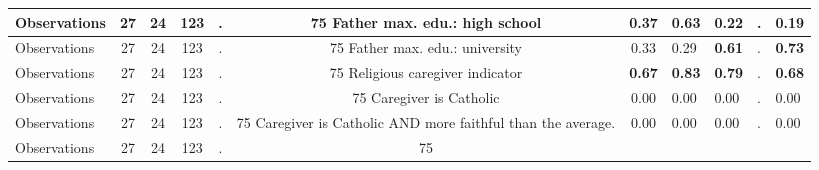 \begin{tabular}{l c c c c c c }
\midrule
Observations &        27 &        24 &       123 & . &        75
Father max. edu.: high school &      0.37 & \textbf{     0.63} & \textbf{     0.22} &         . & \textbf{     0.19} \\
\midrule
Observations &        27 &        24 &       123 & . &        75
Father max. edu.: university &      0.33 &      0.29 & \textbf{     0.61} &         . & \textbf{     0.73} \\
\midrule
Observations &        27 &        24 &       123 & . &        75
Religious caregiver indicator & \textbf{     0.67} & \textbf{     0.83} & \textbf{     0.79} &         . & \textbf{     0.68} \\
\midrule
Observations &        27 &        24 &       123 & . &        75
Caregiver is Catholic &      0.00 &      0.00 &      0.00 &         . &      0.00 \\
\midrule
Observations &        27 &        24 &       123 & . &        75
Caregiver is Catholic AND more faithful than the average. &      0.00 &      0.00 &      0.00 &         . &      0.00 \\
\midrule
Observations &        27 &        24 &       123 & . &        75
\bottomrule
\end{tabular}
